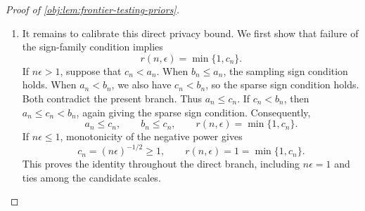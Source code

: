 \begin{proof}[Proof of \cref{obj:lem:frontier-testing-priors}]
\begin{enumerate}
Integrate this measurable conditional coupling over uniform \(X\), and
take \(n\) independent copies. Group their first and second coordinates
into \(D,D'\in\mathcal O^n\), and define
\[
\gamma_{\mathrm{dir}}:=\mathcal L(D,D').
\]
The product construction gives
\[
\mathcal L(D)=Q^{(0)},\qquad \mathcal L(D')=Q^{(1)}.
\]
At a fixed covariate, precisely the crossing atom contributes to record
disagreement. Since \(q\le1\) and vanishes when
\(|x-x_0|\ge h_{\mathrm L}\),
\[
\int_0^1q(x)\,dx
\le\int_0^1\mathbf1\{|x-x_0|<h_{\mathrm L}\}\,dx
\le2h_{\mathrm L}.
\]
Adding the \(n\) record disagreement costs therefore yields
\[
\begin{aligned}
\int d_{\mathrm H}(D,D')\,\gamma_{\mathrm{dir}}(dD,dD')
&=\sum_{i=1}^n\Pr\{D_i\ne D'_i\}\\
&=n\int_0^1\omega_{\mathrm{cross}}(x)\,dx\\
&=\frac{nt}{2}\int_0^1q(x)\,dx
\le nth_{\mathrm L}.
\end{aligned}
\]
By \cref{obj:lem:private-kernel-comparison} and the definition of the
infimum coupling cost,
\[
\begin{aligned}
d_{\mathrm{TV}}(MQ^{(0)},MQ^{(1)})
&\le2\epsilon W_{\mathrm H}(Q^{(0)},Q^{(1)})\\
&\le2\epsilon
 \int d_{\mathrm H}(D,D')\,\gamma_{\mathrm{dir}}(dD,dD')\\
&\le2\epsilon nth_{\mathrm L}.
\end{aligned}
\]

\item It remains to calibrate this direct privacy bound. We first show
that failure of the sign-family condition implies
\[
r(n,\epsilon)=\min\{1,c_n\}.
\]
If \(n\epsilon>1\), suppose that \(c_n<a_n\). When \(b_n\le a_n\), the
sampling sign condition holds. When \(a_n<b_n\), we also have
\(c_n<b_n\), so the sparse sign condition holds. Both contradict the
present branch. Thus \(a_n\le c_n\). If \(c_n<b_n\), then
\(a_n\le c_n<b_n\), again giving the sparse sign condition. Consequently,
\[
a_n\le c_n,\qquad b_n\le c_n,\qquad
r(n,\epsilon)=\min\{1,c_n\}.
\]
If \(n\epsilon\le1\), monotonicity of the negative power gives
\[
c_n=(n\epsilon)^{-1/2}\ge1,\qquad
r(n,\epsilon)=1=\min\{1,c_n\}.
\]
This proves the identity throughout the direct branch, including
\(n\epsilon=1\) and ties among the candidate scales.


\end{enumerate}
\end{proof}
